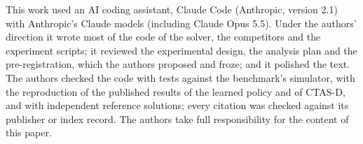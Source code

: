 This work used an AI coding assistant, Claude Code (Anthropic, version 2.1) with Anthropic's Claude models (including
Claude Opus 5.5). Under the authors' direction it wrote most of the code of the solver, the competitors and the
experiment scripts; it reviewed the experimental design, the analysis plan and the pre-registration, which the authors
proposed and froze; and it polished the text. The authors checked the code with tests against the benchmark's
simulator, with the reproduction of the published results of the learned policy and of CTAS-D, and with independent
reference solutions; every citation was checked against its publisher or index record. The authors take full
responsibility for the content of this paper.
